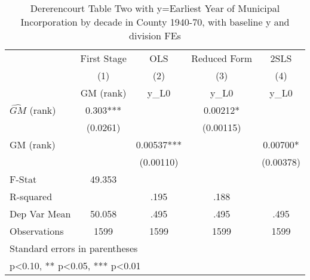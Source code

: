 \begin{table}[htbp]\centering
\def\sym#1{\ifmmode^{#1}\else\(^{#1}\)\fi}
\caption{Dererencourt Table Two with y=Earliest Year of Municipal Incorporation by decade in County 1940-70, with baseline y and division FEs}
\begin{tabular}{l*{4}{c}}
\toprule
                    & First Stage   &         OLS   &Reduced Form   &        2SLS   \\
                    &\multicolumn{1}{c}{(1)}&\multicolumn{1}{c}{(2)}&\multicolumn{1}{c}{(3)}&\multicolumn{1}{c}{(4)}\\
                    &\multicolumn{1}{c}{GM  (rank)}&\multicolumn{1}{c}{y\_L0}&\multicolumn{1}{c}{y\_L0}&\multicolumn{1}{c}{y\_L0}\\
\midrule
$\hat{GM}$ (rank)   &       0.303***&               &     0.00212*  &               \\
                    &    (0.0261)   &               &   (0.00115)   &               \\
\addlinespace
GM  (rank)          &               &     0.00537***&               &     0.00700*  \\
                    &               &   (0.00110)   &               &   (0.00378)   \\
\midrule
F-Stat              &      49.353   &               &               &               \\
R-squared           &               &        .195   &        .188   &               \\
Dep Var Mean        &      50.058   &        .495   &        .495   &        .495   \\
Observations        &        1599   &        1599   &        1599   &        1599   \\
\bottomrule
\multicolumn{5}{l}{\footnotesize Standard errors in parentheses}\\
\multicolumn{5}{l}{\footnotesize * p<0.10, ** p<0.05, *** p<0.01}\\
\end{tabular}
\end{table}
